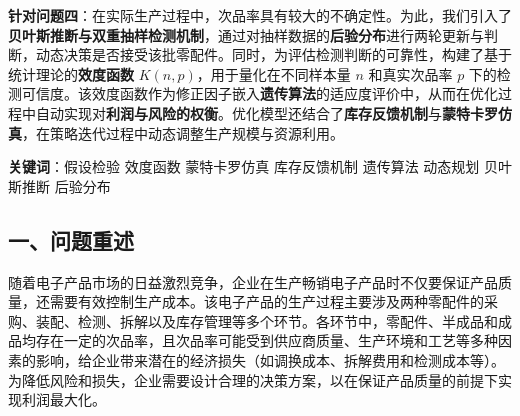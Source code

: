 \documentclass{article}
\begin{document}
	 \vspace{1.5em}  %
	 
	\noindent \textbf{针对问题四}：在实际生产过程中，次品率具有较大的不确定性。为此，我们引入了\textbf{贝叶斯推断与双重抽样检测机制}，通过对抽样数据的\textbf{后验分布}进行两轮更新与判断，动态决策是否接受该批零配件。同时，为评估检测判断的可靠性，构建了基于统计理论的\textbf{效度函数} $K(n,p)$，用于量化在不同样本量 $n$ 和真实次品率 $p$ 下的检测可信度。该效度函数作为修正因子嵌入\textbf{遗传算法}的适应度评价中，从而在优化过程中自动实现对\textbf{利润与风险的权衡}。优化模型还结合了\textbf{库存反馈机制}与\textbf{蒙特卡罗仿真}，在策略迭代过程中动态调整生产规模与资源利用。

	 \vspace{2em}  %
	 
	 \noindent \textbf{关键词}：假设检验 \quad 效度函数 \quad 蒙特卡罗仿真   \quad 库存反馈机制  \quad 遗传算法 \quad 动态规划 \quad 贝叶斯推断 \quad 后验分布
	 

	\newpage
	
	
	
	
	
	
	
	
	\begin{center}
		\section*{一、问题重述}
	\end{center}
	随着电子产品市场的日益激烈竞争，企业在生产畅销电子产品时不仅要保证产品质量，还需要有效控制生产成本。该电子产品的生产过程主要涉及两种零配件的采购、装配、检测、拆解以及库存管理等多个环节。各环节中，零配件、半成品和成品均存在一定的次品率，且次品率可能受到供应商质量、生产环境和工艺等多种因素的影响，给企业带来潜在的经济损失（如调换成本、拆解费用和检测成本等）。为降低风险和损失，企业需要设计合理的决策方案，以在保证产品质量的前提下实现利润最大化。
	

	
	
\end{document}
